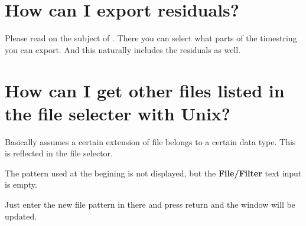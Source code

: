 \section{How can I export residuals?}
Please read on the subject of 
. 
There you can select what parts of the timestring you can export.
And this naturally includes the residuals as well.

\section{How can I get other files listed in the file selecter with Unix?}
Basically \period assumes a certain extension of file belongs to a certain
data type. This is reflected in the file selector. 

The pattern used at the begining is not displayed, but the
{\bf File/Filter} text input is empty.

Just enter the new file pattern in there and press return and the
window will be updated.

